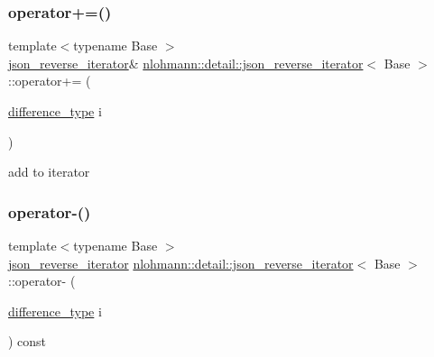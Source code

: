 \subsubsection{\texorpdfstring{operator+=()}{operator+=()}}
{\footnotesize\ttfamily template$<$typename Base $>$ \\
\hyperlink{classnlohmann_1_1detail_1_1json__reverse__iterator}{json\+\_\+reverse\+\_\+iterator}\& \hyperlink{classnlohmann_1_1detail_1_1json__reverse__iterator}{nlohmann\+::detail\+::json\+\_\+reverse\+\_\+iterator}$<$ Base $>$\+::operator+= (\begin{DoxyParamCaption}\item[{\hyperlink{classnlohmann_1_1detail_1_1json__reverse__iterator_a9ab55987c05ec6427ad36082e351cc45}{difference\+\_\+type}}]{i }\end{DoxyParamCaption})\hspace{0.3cm}{\ttfamily [inline]}}



add to iterator 

\mbox{\label{classnlohmann_1_1detail_1_1json__reverse__iterator_a549c6eb10b6434eaf772f71d129a6d79}} 
\subsubsection{\texorpdfstring{operator-\/()}{operator-()}\hspace{0.1cm}{\footnotesize\ttfamily [1/2]}}
{\footnotesize\ttfamily template$<$typename Base $>$ \\
\hyperlink{classnlohmann_1_1detail_1_1json__reverse__iterator}{json\+\_\+reverse\+\_\+iterator} \hyperlink{classnlohmann_1_1detail_1_1json__reverse__iterator}{nlohmann\+::detail\+::json\+\_\+reverse\+\_\+iterator}$<$ Base $>$\+::operator-\/ (\begin{DoxyParamCaption}\item[{\hyperlink{classnlohmann_1_1detail_1_1json__reverse__iterator_a9ab55987c05ec6427ad36082e351cc45}{difference\+\_\+type}}]{i }\end{DoxyParamCaption}) const\hspace{0.3cm}{\ttfamily [inline]}}




